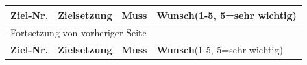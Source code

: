 \begin{longtable}{|p{1cm}|p{9cm}|p{1.5cm}|p{2cm}|}
\hline
\textbf{Ziel-Nr.}\cellcolor[HTML]{C0C0C0} & \textbf{Zielsetzung}\cellcolor[HTML]{C0C0C0} & \textbf{Muss}\cellcolor[HTML]{C0C0C0} & \textbf{Wunsch}\newline (1-5, 5=sehr wichtig)\cellcolor[HTML]{C0C0C0}\\
\hline
\endfirsthead
\multicolumn{4}{l}{Fortsetzung von vorheriger Seite} \\
\hline

\textbf{Ziel-Nr.}\cellcolor[HTML]{C0C0C0} & \textbf{Zielsetzung}\cellcolor[HTML]{C0C0C0} & \textbf{Muss}\cellcolor[HTML]{C0C0C0} & \textbf{Wunsch}\newline (1-5, 5=sehr wichtig)\cellcolor[HTML]{C0C0C0} \\


\end{longtable}
